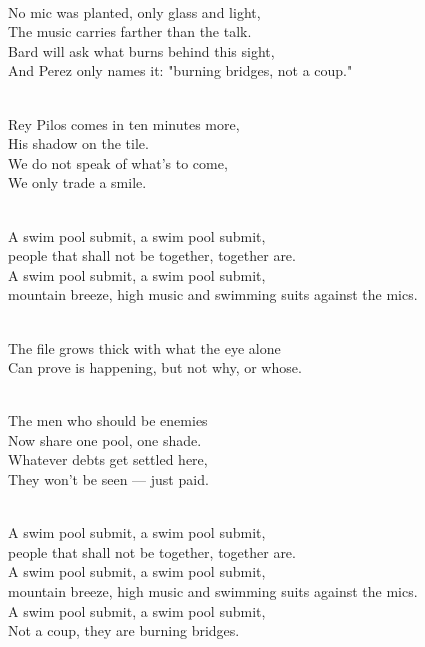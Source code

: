 \begin{lyrics}
\\
No mic was planted, only glass and light,\\
The music carries farther than the talk.\\
Bard will ask what burns behind this sight,\\
And Perez only names it: "burning bridges, not a coup."

\\
Rey Pilos comes in ten minutes more,\\
His shadow on the tile.\\
We do not speak of what's to come,\\
We only trade a smile.

\\
A swim pool submit, a swim pool submit,\\
people that shall not be together, together are.\\
A swim pool submit, a swim pool submit,\\
mountain breeze, high music and swimming suits against the mics.

\\
The file grows thick with what the eye alone\\
Can prove is happening, but not why, or whose.

\\
The men who should be enemies\\
Now share one pool, one shade.\\
Whatever debts get settled here,\\
They won't be seen — just paid.

\\
A swim pool submit, a swim pool submit,\\
people that shall not be together, together are.\\
A swim pool submit, a swim pool submit,\\
mountain breeze, high music and swimming suits against the mics.\\
A swim pool submit, a swim pool submit,\\
Not a coup, they are burning bridges.
\end{lyrics}

